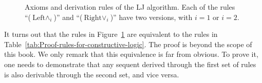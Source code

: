 \begin{figure}
\begin{centering}
\par\end{centering}
\caption{Axioms and derivation rules of the LJ algorithm. Each of the rules
\textquotedblleft ($\text{Left}\wedge_{i}$)\textquotedblright{} and
\textquotedblleft ($\text{Right}\vee_{i}$)\textquotedblright{} have
two versions, with $i=1$ or $i=2$. \label{fig:Rules-of-the-LJ-algorithm}}
\end{figure}

It turns out that the rules in Figure~\ref{fig:Rules-of-the-LJ-algorithm}
are equivalent to the rules in Table~\ref{tab:Proof-rules-for-constructive-logic}.
The proof is beyond the scope of this book. We only remark that this
equivalence is far from obvious. To prove it, one needs to demonstrate
that any sequent derived through the first set of rules is also derivable
through the second set, and vice versa.

